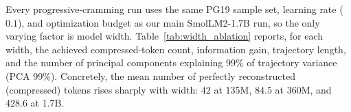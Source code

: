 Every progressive-cramming run uses the same PG19 sample set, learning rate ($0.1$), and optimization budget as our main SmolLM2-1.7B run, so the only varying factor is model width. Table~\ref{tab:width_ablation} reports, for each width, the achieved compressed-token count, information gain, trajectory length, and the number of principal components explaining 99\% of trajectory variance (PCA 99\%).
Concretely, the mean number of perfectly reconstructed (compressed) tokens rises sharply with width: $42$ at 135M, $84.5$ at 360M, and $428.6$ at 1.7B.

\begin{table}[t]
    \centering
    \caption{Model-width ablation on the SmolLM2 family. Every model is truncated to its first $4$ and last $4$ decoder layers ($8$ layers total), holding depth fixed while width varies (hidden sizes $576$, $960$, $2048$). Each width is recovered by plain causal-LM finetuning before measuring compression (evaluated with baseline random per-sample initialization). ``Compressed Tokens'' is the achieved prefix length $n$, ``Trajectory Length'' is $L_{\text{traj}}$, and ``PCA 99\%'' is the number of principal components explaining 99\% of trajectory variance.}
    \label{tab:width_ablation}
    \begin{small}
    
    \end{small}
\vskip -0.1in
\end{table}


